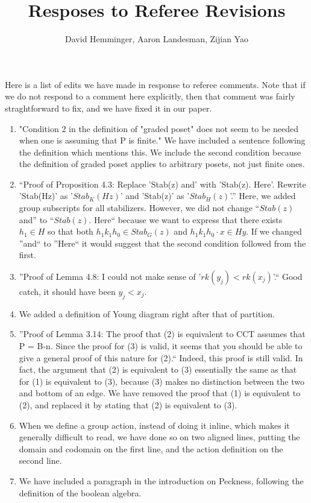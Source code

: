 \documentclass[10 pt]{amsart}
\title{Resposes to Referee Revisions}
\author{David Hemminger, Aaron Landesman, Zijian Yao}
\theoremstyle{plain}
\theoremstyle{definition}
\theoremstyle{remark}
\numberwithin{equation}{section}
\begin{document}
\maketitle

Here is a list of edits we have made in response to referee comments.
Note that if we do not respond to a comment here explicitly, then
that comment was fairly straghtforward to fix, and we have
fixed it in our paper.

\begin{enumerate}
	\item "Condition 2 in the definition of "graded poset" does not seem to be needed when one is assuming that P is finite."
We have included a sentence
		following the definition which mentions this.
		We include the second condition because the definition of graded poset applies to arbitrary
		posets, not just finite ones. 
	\item  ``Proof of Proposition 4.3:  Replace 'Stab(z) and' with 'Stab(z). Here'.  Rewrite 'Stab(Hz)' as '$Stab_K(Hz)$' and 'Stab(z)' as '$Stab_H(z)$'.''
		Here, we added group subscripts for all stabilizers.
		However, we did not change ``$Stab(z)$ and'' to ``$Stab(z)$. Here`` because we want to express that there exists $h_1 \in H$ so that both
		$h_1 k_1 h_0 \in Stab_G(z)$ and $h_1k_1h_0 \cdot x \in Hy$.
		If we changed ''and`` to ''Here`` it would suggest
		that the second condition followed from the first.
	\item ''Proof of Lemma 4.8:  I could not make sense of '$rk(y_j) < rk(x_j)$'.`` Good catch, it should have been $y_j < x_j$.
	\item We added a definition of Young diagram right after that of partition.
	\item ''Proof of Lemma 3.14:  The proof that (2) is equivalent to CCT assumes that P = B-n.  Since the proof for (3) is valid, it seems that you should be able to give a general proof of this nature for (2).``
		Indeed, this proof is still valid. In fact, the argument that (2) is equivalent to (3) essentially the same as that for (1) is equivalent to (3), because (3) makes no distinction between the two and bottom of an edge. We have removed the proof that (1) is equivalent to (2), and replaced it by stating that (2) is equivalent to (3).
	\item When we define a group action, instead of doing it inline, which makes it generally difficult to read, we have done so on two aligned lines, putting the domain and codomain on the first line, and the action definition on the second line.
	\item We have included a paragraph in the introduction on Peckness, following the definition of the boolean algebra.
\end{enumerate}
\end{document}
